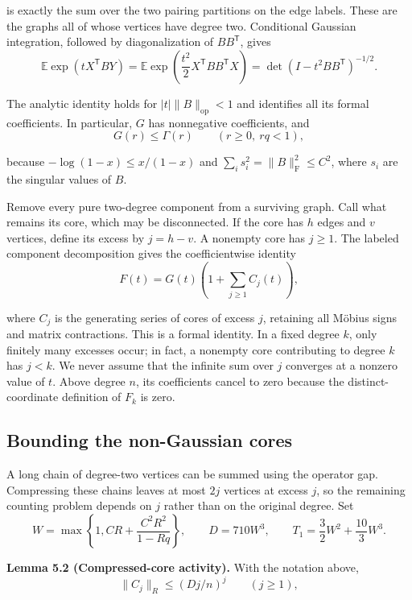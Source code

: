 \documentclass[11pt,a4paper]{article}
\makeatletter
\newcommand{\paperstatement}[3]{\par\addvspace{6pt}\Needspace{4\baselineskip}\phantomsection\def\@currentlabel{#2}\label{#3}\noindent\textbf{#1}\enspace}
\makeatother
\begin{document}
is exactly the sum over the two pairing partitions on the edge labels. These are the graphs all of whose vertices have degree two. Conditional Gaussian integration, followed by diagonalization of \(BB^{\mathsf T}\), gives
\[\mathbb E\exp(tX^{\mathsf T}BY)
=\mathbb E\exp\!\left(\frac{t^2}{2}X^{\mathsf T}BB^{\mathsf T}X\right)
=\det(I-t^2BB^{\mathsf T})^{-1/2}.\]

The analytic identity holds for \(|t|\|B\|_{\mathrm{op}}<1\) and identifies all its formal coefficients. In particular, \(G\) has nonnegative coefficients, and
\[G(r)\le\Gamma(r)\qquad(r\ge0,\ rq<1),\]

because \(-\log(1-x)\le x/(1-x)\) and \(\sum_i s_i^2=\|B\|_{\mathrm F}^2\le C^2\), where \(s_i\) are the singular values of \(B\).

Remove every pure two-degree component from a surviving graph. Call what remains its core, which may be disconnected. If the core has \(h\) edges and \(v\) vertices, define its excess by \(j=h-v\). A nonempty core has \(j\ge1\). The labeled component decomposition gives the coefficientwise identity
\[F(t)=G(t)\left(1+\sum_{j\ge1}C_j(t)\right),\]

where \(C_j\) is the generating series of cores of excess \(j\), retaining all Möbius signs and matrix contractions. This is a formal identity. In a fixed degree \(k\), only finitely many excesses occur; in fact, a nonempty core contributing to degree \(k\) has \(j<k\). We never assume that the infinite sum over \(j\) converges at a nonzero value of \(t\). Above degree \(n\), its coefficients cancel to zero because the distinct-coordinate definition of \(F_k\) is zero.

\subsection{Bounding the non-Gaussian cores}\label{sec-5.3}

A long chain of degree-two vertices can be summed using the operator gap. Compressing these chains leaves at most \(2j\) vertices at excess \(j\), so the remaining counting problem depends on \(j\) rather than on the original degree. Set
\[W=\max\left\{1,CR+\frac{C^2R^2}{1-Rq}\right\},
\qquad D=710W^3,\qquad
T_1=\frac32W^2+\frac{10}{3}W^3.\]

\paperstatement{Lemma 5.2 (Compressed-core activity).}{5.2}{thm-5.2} With the notation above,
\begin{equation}
\|C_j\|_R\le(Dj/n)^j\qquad(j\ge1),
\tag{5.2}\label{eq-core-activity}
\end{equation}
\end{document}
